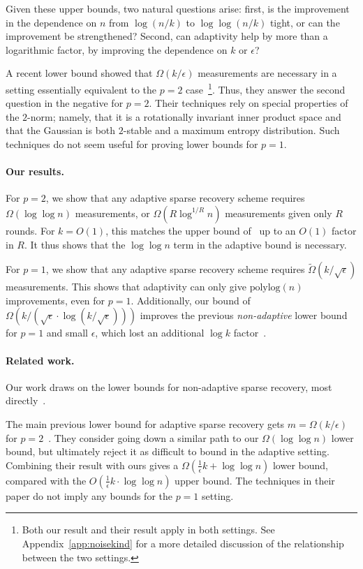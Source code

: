 \documentclass[twoside,leqno,twocolumn]{article}
\def\eps{\epsilon}
\begin{document}
Given these upper bounds, two natural questions arise: first, is the
improvement in the dependence on $n$ from $\log (n/k)$ to $\log \log
(n/k)$ tight, or can the improvement be strengthened?  Second, can
adaptivity help by more than a logarithmic factor, by improving the
dependence on $k$ or $\eps$?

A recent lower bound showed that $\Omega(k/\eps)$ measurements are
necessary in a setting essentially equivalent to the $p = 2$
case~\cite{ACD11}\footnote{Both our result and their result apply in
  both settings.  See Appendix~\ref{app:noisekind} for a more detailed
  discussion of the relationship between the two settings.}.  Thus, they
answer the second question in the negative for $p=2$.
Their techniques rely on special properties of the
$2$-norm; namely, that it is a rotationally invariant inner product
space and that the Gaussian is both $2$-stable and a maximum entropy
distribution.  Such techniques do not seem useful for proving lower
bounds for $p = 1$.

\paragraph{Our results.} For $p=2$, we show that any adaptive sparse
recovery scheme requires $\Omega(\log \log n)$ measurements, or
$\Omega(R \log^{1/R} n)$ measurements given only $R$ rounds.  For $k =
O(1)$, this matches the upper bound of~\cite{IPW11} up to an
$O(1)$ factor in $R$.  It thus shows that the $\log \log n$
term in the adaptive bound is necessary.

For $p=1$, we show that any adaptive sparse recovery scheme requires
$\widetilde{\Omega}(k/\sqrt{\eps})$ measurements. This shows that
adaptivity can only give $\text{polylog}(n)$ improvements, even for $p
= 1$.  Additionally, our bound of $\Omega(k / (\sqrt{\eps} \cdot \log
(k / \sqrt{\eps})))$ improves the previous \emph{non-adaptive} lower
bound for $p=1$ and small $\eps$, which lost an additional $\log k$
factor~\cite{PW11}.

\paragraph{Related work.} Our work draws on the lower bounds for
non-adaptive sparse recovery, most directly~\cite{PW11}.

The main previous lower bound for adaptive sparse recovery gets $m =
\Omega(k/\eps)$ for $p=2$~\cite{ACD11}.  They consider going down a
similar path to our $\Omega(\log \log n)$ lower bound, but ultimately
reject it as difficult to bound in the adaptive setting.  Combining
their result with ours gives a $\Omega(\frac{1}{\eps}k + \log \log n)$
lower bound, compared with the $O(\frac{1}{\eps}k \cdot \log \log n)$
upper bound. The techniques in their paper do not imply any bounds for
the $p = 1$ setting.
\end{document}
